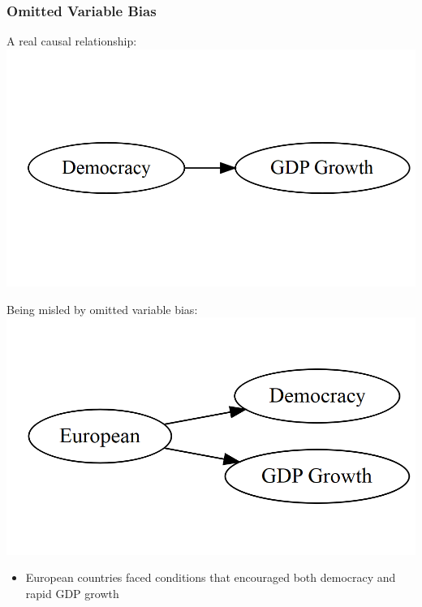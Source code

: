 \documentclass[xcolor=x11names,compress]{beamer}\usepackage[]{graphicx}\usepackage[]{color}
\makeatletter
\def\maxwidth{ %
  \ifdim\Gin@nat@width>\linewidth
    \linewidth
  \else
    \Gin@nat@width
  \fi
}
\newenvironment{knitrout}{}{} %
\renewcommand{\(}{\begin{columns}}
\renewcommand{\)}{\end{columns}}
\newcommand{\<}[1]{\begin{column}{#1}}
\renewcommand{\>}{\end{column}}
\makeatother
\begin{document}
\begin{frame}
\frametitle{Omitted Variable Bias}
\begin{multicols}{2}
A real causal relationship:
\begin{knitrout}
\color{fgcolor}
\includegraphics[width=\maxwidth]{figure/explanation9-1} 

\end{knitrout}
\columnbreak
Being misled by omitted variable bias:
\begin{knitrout}
\color{fgcolor}
\includegraphics[width=\maxwidth]{figure/explanation10-1} 

\end{knitrout}
\end{multicols}
\begin{itemize}
\pause
\item European countries faced conditions that encouraged both democracy and rapid GDP growth
\end{itemize}
\end{frame}
\end{document}

